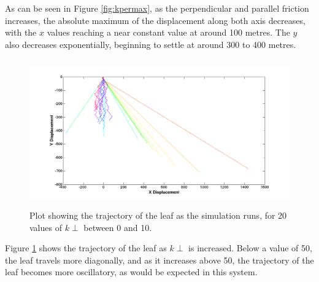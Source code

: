 \noindent As can be seen in Figure \ref{fig:kpermax}, as the perpendicular and parallel friction increases, the absolute maximum of the displacement along both axis decreases, with the $x$ values reaching a near constant value at around 100 metres. The $y$ also decreases exponentially, beginning to settle at around 300 to 400 metres. 

\begin{figure}[H]
	\centering
	\includegraphics[width=1\linewidth, height=2.5in]{Motion_Graphs/kper_xy.png}
	\caption{Plot showing the trajectory of the leaf as the simulation runs, for 20 values of $k{\perp}$ between 0 and 10. }\label{fig:kper_xy}
\end{figure}

\noindent Figure \ref{fig:kper_xy} shows the trajectory of the leaf as $k{\perp}$ is increased. Below a value of 50, the leaf travels more diagonally, and as it increases above 50, the trajectory of the leaf becomes more oscillatory, as would be expected in this system.


